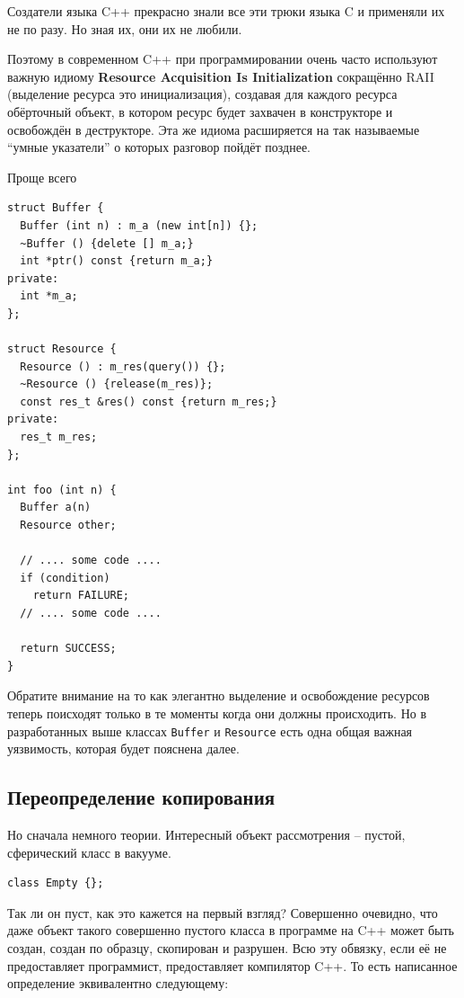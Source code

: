 \documentclass[a4paper,12pt,oneside]{book}
\begin{document}
Создатели языка C++ прекрасно знали все эти трюки языка C и применяли их не по разу. Но зная их, они их не любили. 

Поэтому в современном C++ при программировании очень часто используют важную идиому \textbf{Resource Acquisition Is Initialization} сокращённо RAII (выделение ресурса это инициализация), создавая для каждого ресурса обёрточный объект, в котором ресурс будет захвачен в конструкторе и освобождён в деструкторе. Эта же идиома расширяется на так называемые ``умные указатели'' о которых разговор пойдёт позднее.

Проще всего

\begin{lstlisting}
struct Buffer {
  Buffer (int n) : m_a (new int[n]) {};
  ~Buffer () {delete [] m_a;}
  int *ptr() const {return m_a;}
private:
  int *m_a;
};

struct Resource {
  Resource () : m_res(query()) {};
  ~Resource () {release(m_res)};
  const res_t &res() const {return m_res;}
private:
  res_t m_res;
};

int foo (int n) {
  Buffer a(n)
  Resource other;

  // .... some code ....
  if (condition)
    return FAILURE;
  // .... some code ....

  return SUCCESS;
}

\end{lstlisting}

Обратите внимание на то как элегантно выделение и освобождение ресурсов теперь поисходят только в те моменты когда они должны происходить. Но в разработанных выше классах \lstinline!Buffer! и \lstinline!Resource! есть одна общая важная уязвимость, которая будет пояснена далее.

\subsection{Переопределение копирования}\label{subsub:magicglasses}

Но сначала немного теории. Интересный объект рассмотрения -- пустой, сферический класс в вакууме.

\begin{lstlisting}
class Empty {};
\end{lstlisting}

Так ли он пуст, как это кажется на первый взгляд? Совершенно очевидно, что даже объект такого совершенно пустого класса в программе на C++ может быть создан, создан по образцу, скопирован и разрушен. Всю эту обвязку, если её не предоставляет программист, предоставляет компилятор C++. То есть написанное определение эквивалентно следующему:
\end{document}
